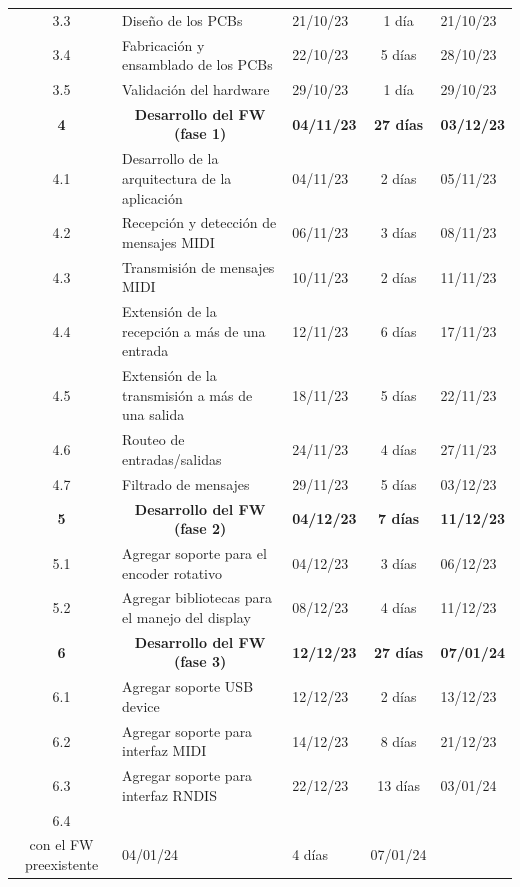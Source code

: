\documentclass[
11pt, %
]{charter}
\begin{document}
\begin{longtable}[c]{|cllcl|}
	3.3 & Diseño de los PCBs & 21/10/23 & 1 día & 21/10/23 \\
	\rowcolor[HTML]{EFEFEF} 
	3.4 & Fabricación y ensamblado de los PCBs & 22/10/23 & 5 días & 28/10/23 \\
	3.5 & Validación del hardware & 29/10/23 & 1 día & 29/10/23 \\
	\rowcolor[HTML]{ECF4FF} 
	\textbf{4} & \multicolumn{1}{c}{\cellcolor[HTML]{ECF4FF}\textbf{Desarrollo del FW (fase 1)}} & \textbf{04/11/23} & \textbf{27 días} & \textbf{03/12/23} \\
	4.1 & Desarrollo de la arquitectura de la aplicación & 04/11/23 & 2 días & 05/11/23 \\
	\rowcolor[HTML]{EFEFEF} 
	4.2 & Recepción y detección de mensajes  MIDI & 06/11/23 & 3 días & 08/11/23 \\
	4.3 & Transmisión de mensajes MIDI & 10/11/23 & 2 días & 11/11/23 \\
	\rowcolor[HTML]{EFEFEF} 
	4.4 & Extensión de la recepción a más de una entrada & 12/11/23 & 6 días & 17/11/23 \\
	4.5 & Extensión de la transmisión a más de una salida & 18/11/23 & 5 días & 22/11/23 \\
	\rowcolor[HTML]{EFEFEF} 
	4.6 & Routeo de entradas/salidas & 24/11/23 & 4 días & 27/11/23 \\
	4.7 & Filtrado de mensajes & 29/11/23 & 5 días & 03/12/23 \\
	\rowcolor[HTML]{ECF4FF} 
	\textbf{5} & \multicolumn{1}{c}{\cellcolor[HTML]{ECF4FF}\textbf{Desarrollo del FW (fase 2)}} & \textbf{04/12/23} & \textbf{7 días} & \textbf{11/12/23} \\
	5.1 & Agregar soporte para el encoder rotativo & 04/12/23 & 3 días & 06/12/23 \\
	\rowcolor[HTML]{EFEFEF} 
	5.2 & Agregar bibliotecas para el manejo del display & 08/12/23 & 4 días & 11/12/23 \\
	\rowcolor[HTML]{ECF4FF} 
	\textbf{6} & \multicolumn{1}{c}{\cellcolor[HTML]{ECF4FF}\textbf{Desarrollo del FW (fase 3)}} & \textbf{12/12/23} & \textbf{27 días} & \textbf{07/01/24} \\
	6.1 & Agregar soporte USB device & 12/12/23 & 2 días & 13/12/23 \\
	\rowcolor[HTML]{EFEFEF} 
	6.2 & Agregar soporte para interfaz MIDI & 14/12/23 & 8 días & 21/12/23 \\
	6.3 & Agregar soporte para interfaz RNDIS & 22/12/23 & 13 días & 03/01/24 \\
	\rowcolor[HTML]{EFEFEF} 
	6.4 & \begin{tabular}[c]{@{}l@{}}Integración de la interfaz MIDI\\ con el FW preexistente\end{tabular} & 04/01/24 & 4 días & 07/01/24 \\

\end{longtable}
\end{document}

